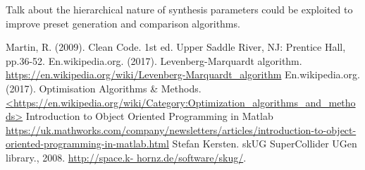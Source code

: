 \documentclass[11pt, oneside]{report}   	%
\begin{document}
Talk about the hierarchical nature of synthesis parameters could be exploited to improve preset generation and comparison algorithms. 
\begin{thebibliography}{9}
\singlespacing
{}
Martin, R. (2009). Clean Code. 1st ed. Upper Saddle River, NJ: Prentice Hall, pp.36-52.
En.wikipedia.org. (2017). Levenberg-Marquardt algorithm. \\
\url{https://en.wikipedia.org/wiki/Levenberg-Marquardt_algorithm}
En.wikipedia.org. (2017). Optimisation Algorithms \& Methods.
\url{<https://en.wikipedia.org/wiki/Category:Optimization_algorithms_and_methods>}
Introduction to Object Oriented Programming in Matlab\\
\url{https://uk.mathworks.com/company/newsletters/articles/introduction-to-object-oriented-programming-in-matlab.html}
Stefan Kersten. skUG SuperCollider UGen library., 2008. \url{http://space.k- hornz.de/software/skug/}.
\end{thebibliography}
\end{document}
